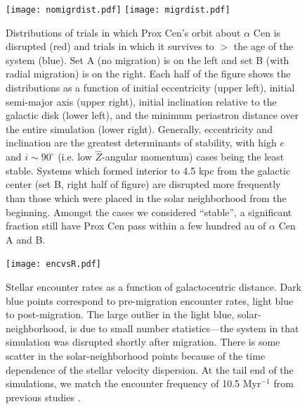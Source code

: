\documentclass[preprint,12pt]{aastex}
\begin{document}
\begin{figure}
\texttt{[image: nomigrdist.pdf]}
\texttt{[image: migrdist.pdf]}
\caption{Distributions of trials in which Prox Cen's orbit about $\alpha$ Cen
  is disrupted (red) and trials in which it survives to $>$ the age of the 
  system (blue). Set A (no migration) is on the left and set B (with 
  radial migration) is on the right. Each half of the figure shows the 
  distributions as a function of initial eccentricity (upper left), initial 
  semi-major axis (upper right), initial inclination relative to the galactic 
  disk (lower left), and the minimum periastron distance over the entire 
  simulation (lower right). Generally, eccentricity and inclination are the 
  greatest determinants of stability, with high $e$ and $i \sim 90^{\circ}$ 
  (i.e. low $\hat{Z}$-angular momentum) cases being the least stable. 
  Systems which formed interior to 4.5 kpc from the galactic center 
  (set B, right half of figure) are disrupted more frequently than 
  those which were placed in the solar neighborhood from the beginning. 
  Amongst the cases we considered ``stable'', a significant fraction still 
  have Prox Cen pass within a few hundred au of $\alpha$ Cen A and B.}
\label{fig:galacdist}
\end{figure}


\begin{figure}
\centering
\texttt{[image: encvsR.pdf]}
\caption{Stellar encounter rates as a function of galactocentric distance.
  Dark blue points correspond to pre-migration encounter rates, light 
  blue to post-migration. The large outlier in the light blue, 
  solar-neighborhood, is due to small number statistics---the system 
  in that simulation was disrupted shortly after migration. There is some 
  scatter in the solar-neighborhood points because of the time dependence 
  of the stellar velocity dispersion. At the tail end of the simulations, we 
  match the encounter frequency of 10.5 Myr$^{-1}$ from previous 
  studies \citep{Garciasanchez2001,Rickman2008}.}
\label{fig:encrates}
\end{figure}

\end{document}
